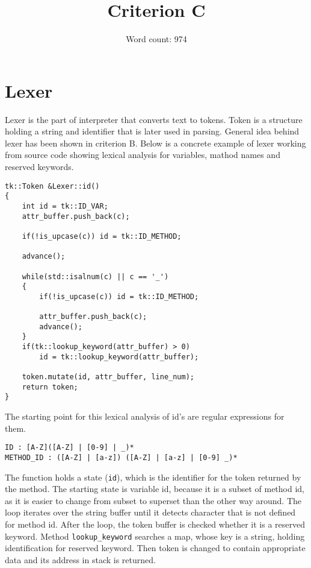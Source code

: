 \documentclass{article}
\title{Criterion C}
\author{Word count: 974}
\date{}
\begin{document}
\maketitle
\tableofcontents

\section{Lexer}

    Lexer is the part of interpreter that converts text to tokens. Token is 
    a structure holding a string and identifier that is later used in parsing.
    General idea behind lexer has been shown in criterion B.
    Below is a concrete example of lexer working from source
    code showing lexical analysis for variables, mathod names and reserved
    keywords.
    \begin{verbatim}
tk::Token &Lexer::id()
{
    int id = tk::ID_VAR;
    attr_buffer.push_back(c);

    if(!is_upcase(c)) id = tk::ID_METHOD;

    advance();

    while(std::isalnum(c) || c == '_')
    {
        if(!is_upcase(c)) id = tk::ID_METHOD;

        attr_buffer.push_back(c);
        advance();
    }
    if(tk::lookup_keyword(attr_buffer) > 0)
        id = tk::lookup_keyword(attr_buffer);

    token.mutate(id, attr_buffer, line_num);
    return token;
}   
    \end{verbatim}

    The starting point for this lexical analysis of id's are regular expressions
    for them.
    \begin{verbatim}
ID : [A-Z]([A-Z] | [0-9] | _)*
METHOD_ID : ([A-Z] | [a-z]) ([A-Z] | [a-z] | [0-9] _)*
    \end{verbatim}
    The function holds a state (\texttt{id}), which is the identifier
    for the token returned by the method. The starting state is variable id, because
    it is a subset of method id, as it is easier to change from subset to superset
    than the other way around. The loop iterates over the string buffer until it 
    detects character that is not defined for method id. After the loop, the token
    buffer is checked whether it is a reserved keyword. Method \texttt{lookup\_keyword}
    searches a map, whose key is a string, holding identification for reserved keyword. 
    Then token is changed to contain appropriate data and its address in stack
    is returned.
\end{document}
